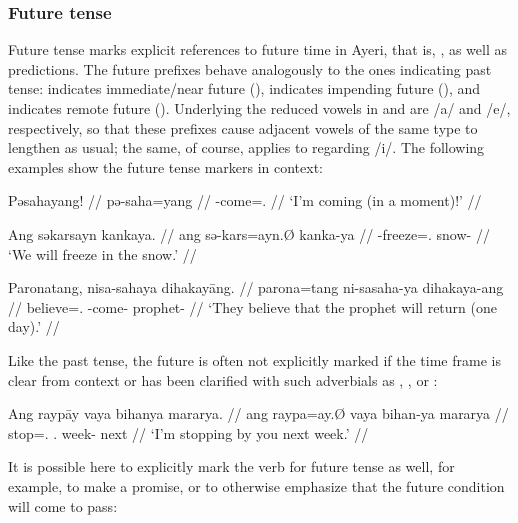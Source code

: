 
\subsubsection{Future tense}
\label{subsubsec:future}

Future tense marks explicit references to future time in Ayeri, that is,
, as well
as predictions. The future prefixes behave analogously to the ones indicating
past tense:  indicates immediate/near future (\NFut{}),
 indicates impending future (\Fut{}), and 
indicates remote future (\RFut{}). Underlying the reduced vowels in
 and  are /a/ and /e/, respectively, so that these
prefixes cause adjacent vowels of the same type to lengthen as
usual; the same, of course, applies to 
regarding /i/. The following examples show the future tense markers in context:

\pex
\a\label{ex:nfut}\begingl
	\gla Pəsahayang! //
	\glb pə-saha=yang //
	\glc \NFut{}-come=\Fsg{}.\Aarg{} //
	\glft `I'm coming (in a moment)!' //
\endgl

\a\label{ex:fut}\begingl
	\gla Ang səkarsayn kankaya. //
	\glb ang sə-kars=ayn.Ø kanka-ya //
	\glc \AgtT{} \Fut{}-freeze=\Fsg{}.\Top{} snow-\Loc{} //
	\glft `We will freeze in the snow.' //
\endgl

\a\label{ex:rfut}\begingl
	\gla Paronatang, nisa-sahaya dihakayāng. //
	\glb parona=tang ni-sa\til{}saha-ya dihakaya-ang //
	\glc believe=\TplM{}.\Aarg{} \RFut{}-\Iter{}\til{}come-\TsgM{} 
		prophet-\Aarg{} //
	\glft `They believe that the prophet will return (one day).' //
\endgl

\xe

Like the past tense, the future is often not explicitly marked if the time 
frame is clear from context or has been clarified with such adverbials as 
, , or :

\ex\begingl
	\gla Ang raypāy vaya bihanya mararya. //
	\glb ang raypa=ay.Ø vaya bihan-ya mararya //
	\glc \AgtT{} stop=\Fsg{}.\Top{} \Ssg{}.\Loc{} week-\Loc{} next //
	\glft `I'm stopping by you next week.' //
\endgl\xe

It is possible here to explicitly mark the verb for future tense as well, for
example, to make a promise, or to otherwise emphasize that the future condition
will come to pass:

